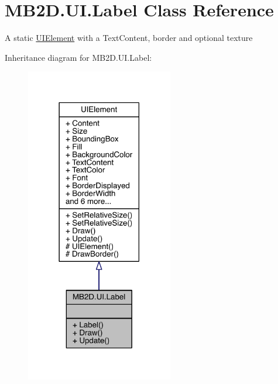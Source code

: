 \hypertarget{class_m_b2_d_1_1_u_i_1_1_label}{}\section{M\+B2\+D.\+U\+I.\+Label Class Reference}
\label{class_m_b2_d_1_1_u_i_1_1_label}


A static \hyperlink{class_m_b2_d_1_1_u_i_1_1_u_i_element}{U\+I\+Element} with a Text\+Content, border and optional texture  




Inheritance diagram for M\+B2\+D.\+U\+I.\+Label\+:
\nopagebreak
\begin{figure}[H]
\begin{center}
\leavevmode
\includegraphics[width=182pt]{class_m_b2_d_1_1_u_i_1_1_label__inherit__graph}
\end{center}
\end{figure}



